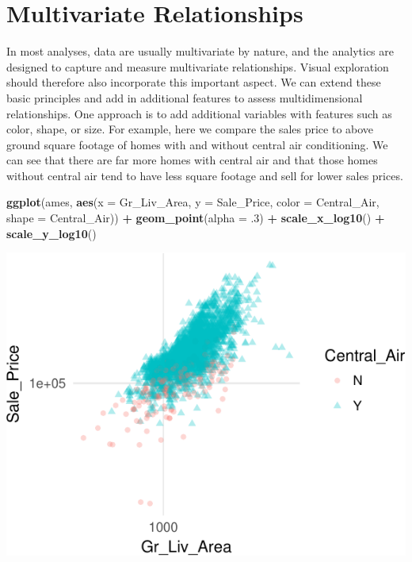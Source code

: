 \documentclass[]{article}
\newenvironment{Shaded}{\begin{snugshade}}{\end{snugshade}}
\newcommand{\KeywordTok}[1]{\textcolor[rgb]{0.13,0.29,0.53}{\textbf{#1}}}
\newcommand{\DataTypeTok}[1]{\textcolor[rgb]{0.13,0.29,0.53}{#1}}
\newcommand{\DecValTok}[1]{\textcolor[rgb]{0.00,0.00,0.81}{#1}}
\newcommand{\StringTok}[1]{\textcolor[rgb]{0.31,0.60,0.02}{#1}}
\newcommand{\OperatorTok}[1]{\textcolor[rgb]{0.81,0.36,0.00}{\textbf{#1}}}
\newcommand{\NormalTok}[1]{#1}
\begin{document}
\section{Multivariate Relationships}\label{multivariate-relationships}

In most analyses, data are usually multivariate by nature, and the
analytics are designed to capture and measure multivariate
relationships. Visual exploration should therefore also incorporate this
important aspect. We can extend these basic principles and add in
additional features to assess multidimensional relationships. One
approach is to add additional variables with features such as color,
shape, or size. For example, here we compare the sales price to above
ground square footage of homes with and without central air
conditioning. We can see that there are far more homes with central air
and that those homes without central air tend to have less square
footage and sell for lower sales prices.

\begin{Shaded}
\begin{Highlighting}[]
\KeywordTok{ggplot}\NormalTok{(ames, }\KeywordTok{aes}\NormalTok{(}\DataTypeTok{x =}\NormalTok{ Gr_Liv_Area, }\DataTypeTok{y =}\NormalTok{ Sale_Price, }\DataTypeTok{color =}\NormalTok{ Central_Air, }\DataTypeTok{shape =}\NormalTok{ Central_Air)) }\OperatorTok{+}
\StringTok{  }\KeywordTok{geom_point}\NormalTok{(}\DataTypeTok{alpha =}\NormalTok{ .}\DecValTok{3}\NormalTok{) }\OperatorTok{+}
\StringTok{  }\KeywordTok{scale_x_log10}\NormalTok{() }\OperatorTok{+}
\StringTok{  }\KeywordTok{scale_y_log10}\NormalTok{()}
\end{Highlighting}
\end{Shaded}

\begin{center}\includegraphics{Chapter_3_-_Visualization_files/figure-latex/multidim1-1} \end{center}
\end{document}
